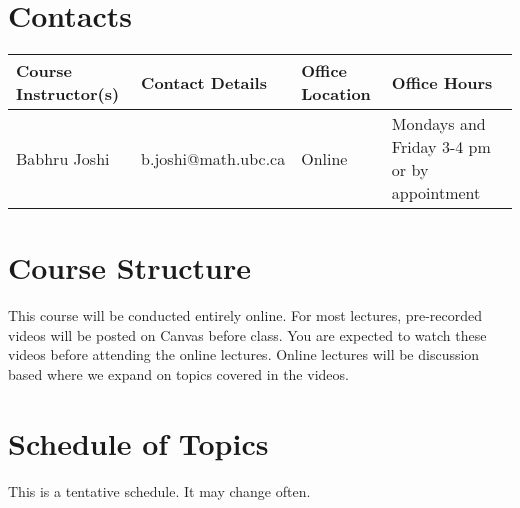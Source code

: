 \documentclass[12pt,usletter]{article} %
\begin{document}
\section*{Contacts}

\begin{tabu} to \textwidth{ | X[l] | X[l] | X[l] | X[l] | }
\hline 
{}
\textbf{Course Instructor(s)} &
\textbf{Contact Details} &
\textbf{Office Location} &
\textbf{Office Hours} \\
\hline
\relax Babhru Joshi &
\relax b.joshi@math.ubc.ca &
\relax Online &
\relax Mondays and Friday 3-4 pm or by appointment \\
%
\hline
\end{tabu}

\section*{Course Structure}

This course will be conducted entirely online. For most lectures, pre-recorded videos will be posted on Canvas before class. You are expected to watch these videos before attending the online lectures. Online lectures will be discussion based where we expand on topics covered in the videos.

\section*{Schedule of Topics}

This is a tentative schedule. It may change often.
\end{document}
